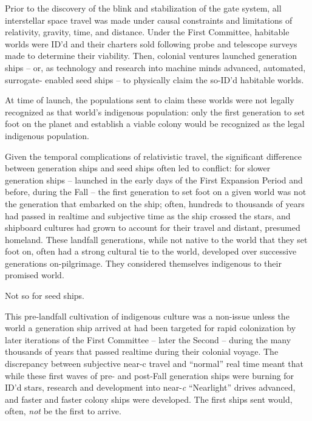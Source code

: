 Prior to the discovery of the blink and stabilization of the gate system, all interstellar space travel
was made under causal constraints and limitations of relativity, gravity, time, and distance. Under
the First Committee, habitable worlds were ID'd and their charters sold following probe and
telescope surveys made to determine their viability. Then, colonial ventures launched generation
ships -- or, as technology and research into machine minds advanced,  automated, surrogate-
enabled seed ships -- to physically claim the so-ID'd habitable worlds.

At time of launch, the populations sent to claim these worlds were not legally recognized as that
world's indigenous population: only the first generation to set foot on the planet and establish a
viable colony would be recognized as the legal indigenous population.

Given the temporal complications of relativistic travel, the significant difference between
generation ships and seed ships often led to conflict: for slower generation ships -- launched in
the early days of the First Expansion Period and before, during the Fall -- the first generation to
set foot on a given world was not the generation that embarked on the ship; often, hundreds to
thousands of years had passed in realtime and subjective time as the ship crossed the stars, and
shipboard cultures had grown to account for their travel and distant, presumed homeland. These
landfall generations, while not native to the world that they set foot on, often had a strong
cultural tie to the world, developed over successive generations on-pilgrimage. They considered
themselves indigenous to their promised world.

Not so for seed ships.

This pre-landfall cultivation of indigenous culture was a non-issue unless the world a generation
ship arrived at had been targeted for rapid colonization by later iterations of the First Committee
-- later the Second -- during the many thousands of years that passed realtime during their
colonial voyage. The discrepancy between subjective near-c travel and ``normal'' real time meant
that while these first waves of pre- and post-Fall generation ships were burning for ID'd stars,
research and development into near-\textit{c} ``Nearlight'' drives advanced, and faster and faster colony
ships were developed. The first ships sent would, often, \textit{not} be the first to arrive.

